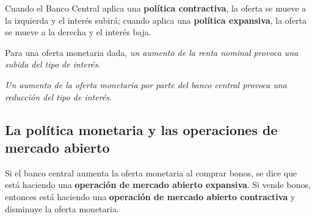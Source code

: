 \documentclass[10pt]{article}
\begin{document}
\begin{multicols*}{2}
Cuando el Banco Central aplica una \textbf{política contractiva}, la oferta se mueve a la izquierda y el interés subirá; cuando aplica una \textbf{política expansiva}, la oferta se mueve a la derecha y el interés baja.

\begin{center}    
\end{center}

Para una oferta monetaria dada, \textit{un aumento de la renta nominal provoca una subida del tipo de interés}. 

\textit{Un aumento de la oferta monetaria por parte del banco central provoca una reducción del tipo de interés}.

\subsection{La política monetaria y las operaciones de mercado abierto}
Si el banco central aumenta la oferta monetaria al comprar bonos, se dice que está haciendo una \textbf{operación de mercado abierto expansiva}. Si vende bonos, entonces está haciendo una \textbf{operación de mercado abierto contractiva} y disminuye la oferta monetaria.


\end{multicols*}
\end{document}
